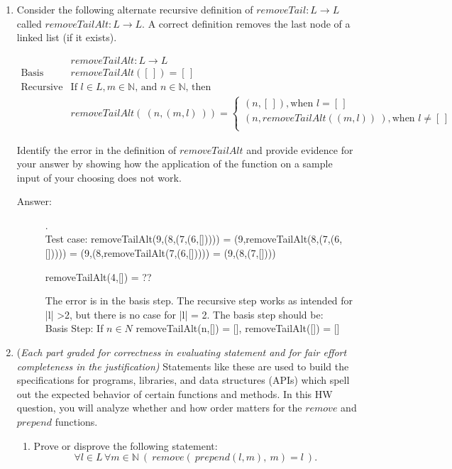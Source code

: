 \documentclass[12pt, oneside]{article}
\begin{document}
\begin{enumerate}
\item Consider the following alternate recursive definition of $\textit{removeTail}: L  \to L$ called $\textit{removeTailAlt}: L  \to L$.  A correct definition removes the last node of a linked list (if it exists). 

\[
\begin{array}{llll}
& \textit{removeTailAlt} : L \to L \\
\textrm{Basis Step:} &  \textit{removeTailAlt}([\,]) = [\,]\\
\textrm{Recursive Step:} & \textrm{If } l \in L, m \in \mathbb{N}\textrm{, and }n \in \mathbb{N}\textrm{, then  }\\&\textit{removeTailAlt}(~(n, (m, l)~)) 
= 
\begin{cases}
   (n, [\,]), \textrm{when } l = [\,] \\
   (n, removeTailAlt((m,l))~),
   \textrm{when } l \neq [\,] \\
\end{cases}

\end{array}
\]

Identify the error in the definition of $\textit{removeTailAlt}$ and provide evidence for your answer by showing how the application of the function on a sample input of your choosing does not work.


\begin{description}
    \item[Answer:] .\\
    Test case: removeTailAlt(9,(8,(7,(6,[])))) = (9,removeTailAlt(8,(7,(6,[])))) = (9,(8,removeTailAlt(7,(6,[])))) = (9,(8,(7,[])))

    removeTailAlt(4,[]) = ??

    The error is in the basis step. The recursive step works as intended for |l| >2, but there is no case for |l| = 2. The basis step should be:\\
    Basis Step: If $n \in N$ removeTailAlt(n,[]) = [], removeTailAlt([]) = []
\end{description}

\quad

\item ({\it Each part graded for correctness in evaluating statement 
and for fair effort completeness in the justification)} Statements like these are used to build the 
specifications for programs, libraries, and data structures (APIs) which spell out the expected behavior
of certain functions and methods. In this HW question, you will analyze whether and how order matters for the $remove$ and $prepend$
functions.
\begin{enumerate}
\item Prove or disprove the following statement: 
$$\forall l \in L \, \forall m \in \mathbb{N}~(~remove(~prepend(l,m),~m) = l~).$$


\end{enumerate}
\end{enumerate}
\end{document}
